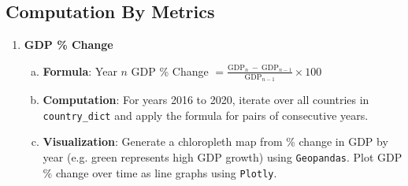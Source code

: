 \documentclass[fontsize=11pt]{article}
\begin{document}
    \subsection*{Computation By Metrics}
    \begin{enumerate}
        \item \textbf{GDP \% Change}
            \begin{enumerate}[(a)]
                \item \textbf{Formula}: Year $n$ GDP \% Change $= \frac{\text{GDP}_{n} \ - \ \text{GDP}_{n-1}}{\text{GDP}_{n-1}} \times 100$
                \item \textbf{Computation}: For years 2016 to 2020, iterate over all countries in \texttt{country\_dict} and apply the formula for pairs of consecutive years.
                \item \textbf{Visualization}: Generate a chloropleth map from \% change in GDP by year (e.g. green represents high GDP growth) using \texttt{Geopandas}. Plot GDP \% change over time as line graphs using \texttt{Plotly}.
            \end{enumerate}


\end{enumerate}
\end{document}

